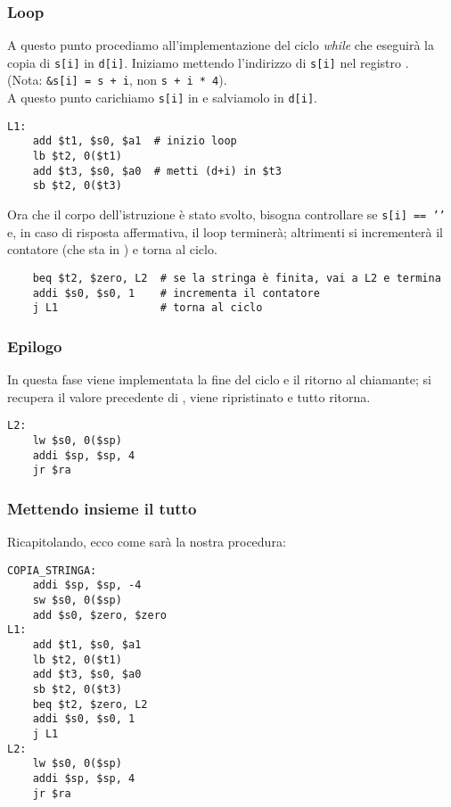 \subsubsection{Loop}
A questo punto procediamo all'implementazione del ciclo \emph{while} che eseguirà la copia di \texttt{s[i]} in \texttt{d[i]}. Iniziamo mettendo l'indirizzo di \texttt{s[i]} nel registro .\\
(Nota: \texttt{&s[i] = s + i}, non \texttt{s + i * 4}).\\
A questo punto carichiamo \texttt{s[i]} in  e salviamolo in \texttt{d[i]}.
\begin{verbatim}
L1:
	add $t1, $s0, $a1  # inizio loop
	lb $t2, 0($t1)
	add $t3, $s0, $a0  # metti (d+i) in $t3
	sb $t2, 0($t3)
\end{verbatim}
Ora che il corpo dell'istruzione è stato svolto, bisogna controllare se \texttt{s[i] == '\0'} e, in caso di risposta affermativa, il loop terminerà; altrimenti si incrementerà il contatore (che sta in ) e torna al ciclo.
\begin{verbatim}
	beq $t2, $zero, L2  # se la stringa è finita, vai a L2 e termina
	addi $s0, $s0, 1    # incrementa il contatore
	j L1                # torna al ciclo
\end{verbatim}

\subsubsection{Epilogo}
In questa fase viene implementata la fine del ciclo e il ritorno al chiamante; si recupera il valore precedente di , viene ripristinato  e tutto ritorna.
\begin{verbatim}
L2:
	lw $s0, 0($sp)
	addi $sp, $sp, 4
	jr $ra
\end{verbatim}

\subsubsection{Mettendo insieme il tutto}
Ricapitolando, ecco come sarà la nostra procedura:
\begin{verbatim}
COPIA_STRINGA:
	addi $sp, $sp, -4
	sw $s0, 0($sp)
	add $s0, $zero, $zero
L1:
	add $t1, $s0, $a1
	lb $t2, 0($t1)
	add $t3, $s0, $a0
	sb $t2, 0($t3)
	beq $t2, $zero, L2
	addi $s0, $s0, 1
	j L1
L2:
	lw $s0, 0($sp)
	addi $sp, $sp, 4
	jr $ra
\end{verbatim}

